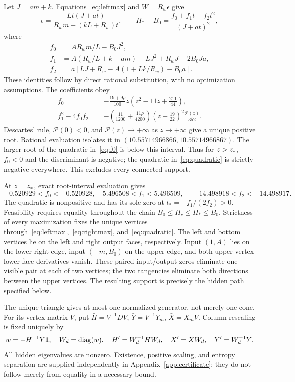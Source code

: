 Let $J=am+k$. Equations~\eqref{eq:leftmax} and $W=R_w\epsilon$ give
\begin{equation}
 \epsilon=\frac{Lt(J+at)}{R_wm+(kL+R_w)t},\qquad
 H_*-B_0=\frac{f_0+f_1t+f_2t^2}{(J+at)^2},\label{eq:quadratic}
\end{equation}
where
\begin{align}
 f_0&=AR_wm/L-B_0J^2,\\
 f_1&=A(R_w/L+k-am)+LJ^2+R_wJ-2B_0Ja,\\
 f_2&=a[LJ+R_w-A(1+Lk/R_w)-B_0a].\label{eq:fcoeff}
\end{align}
These identities follow by direct rational substitution, with no optimization assumptions. The coefficients obey
\begin{align}
 f_0&=-\frac{19+9\rho}{100}z\left(z^2-11z+\frac{211}{44}\right),\label{eq:f0}\\
 f_1^2-4f_0f_2
 &=-\left(\frac{11}{1200}+\frac{11\rho}{4200}\right)
 \left(z+\frac{19}{22}\right)^2\frac{\mathcal P(z)}{352}.\label{eq:discriminant}
\end{align}
Descartes' rule, $\mathcal P(0)<0$, and $\mathcal P(z)\to+\infty$ as $z\to+\infty$ give a unique positive root. Rational evaluation isolates it in $(10.55714966866,10.55714966867)$. The larger root of the quadratic in~\eqref{eq:f0} is below this interval. Thus for $z>z_*$, $f_0<0$ and the discriminant is negative; the quadratic in~\eqref{eq:quadratic} is strictly negative everywhere. This excludes every connected support.

At $z=z_*$, exact root-interval evaluation gives
\begin{equation}
 -0.520929<f_0<-0.520928,\quad
 5.496508<f_1<5.496509,\quad
 -14.498918<f_2<-14.498917.
\end{equation}
The quadratic is nonpositive and has its sole zero at $t_*=-f_1/(2f_2)>0$. Feasibility requires equality throughout the chain $B_0\le H_c\le H_*\le B_0$. Strictness of every maximization fixes the unique vertices through~\eqref{eq:leftmax},~\eqref{eq:rightmax}, and~\eqref{eq:quadratic}. The left and bottom vertices lie on the left and right output faces, respectively. Input $(1,A)$ lies on the lower-right edge, input $(-m,B_0)$ on the upper edge, and both upper-vertex lower-face derivatives vanish. These paired input/output zeros eliminate one visible pair at each of two vertices; the two tangencies eliminate both directions between the upper vertices. The resulting support is precisely the hidden path specified below.

The unique triangle gives at most one normalized generator, not merely one cone. For its vertex matrix $V$, put $\bar H=V^{-1}DV$, $\bar Y=V^{-1}Y_m$, $\bar X=X_mV$. Column rescaling is fixed uniquely by
\begin{equation}
 w=-\bar H^{-1}\bar Y\mathbf 1,\quad W_d=\operatorname{diag}(w),\quad
 H'=W_d^{-1}\bar HW_d,\quad X'=\bar XW_d,\quad Y'=W_d^{-1}\bar Y.\label{eq:normalize}
\end{equation}
All hidden eigenvalues are nonzero. Existence, positive scaling, and entropy separation are supplied independently in Appendix~\ref{app:certificate}; they do not follow merely from equality in a necessary bound.

